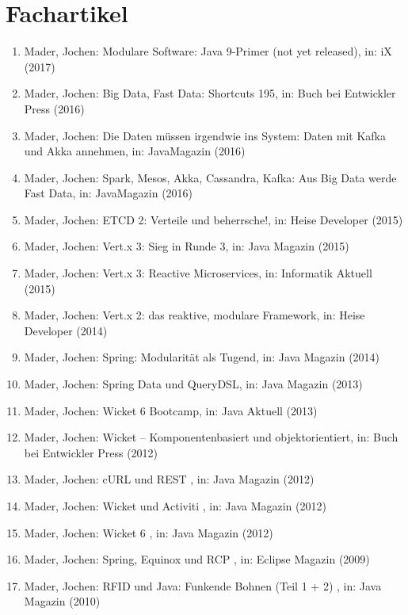 \section*{Fachartikel}
\begin{enumerate}[label=,leftmargin=0cm,itemsep=10pt]
\item Mader, Jochen: Modulare Software: Java 9-Primer (not yet released), in: iX (2017)
\item Mader, Jochen: Big Data, Fast Data: Shortcuts 195, in: Buch bei Entwickler Press (2016)
\item Mader, Jochen: Die Daten müssen irgendwie ins System: Daten mit Kafka und Akka annehmen, in: JavaMagazin (2016) 
\item Mader, Jochen: Spark, Mesos, Akka, Cassandra, Kafka: Aus Big Data werde Fast Data, in: JavaMagazin (2016)
\item Mader, Jochen: ETCD 2: Verteile und beherrsche!, in: Heise Developer (2015)
\item Mader, Jochen: Vert.x 3: Sieg in Runde 3, in: Java Magazin (2015)
\item Mader, Jochen: Vert.x 3: Reactive Microservices, in: Informatik Aktuell (2015)
\item Mader, Jochen: Vert.x 2: das reaktive, modulare Framework, in: Heise Developer (2014)
\item Mader, Jochen: Spring: Modularität als Tugend, in: Java Magazin (2014)
\item Mader, Jochen: Spring Data und QueryDSL, in: Java Magazin (2013)
\item Mader, Jochen: Wicket 6 Bootcamp, in: Java Aktuell (2013)
\item Mader, Jochen: Wicket – Komponentenbasiert und objektorientiert, in: Buch bei Entwickler Press (2012)
\item Mader, Jochen: cURL und REST , in: Java Magazin (2012)
\item Mader, Jochen: Wicket und Activiti , in: Java Magazin (2012)
\item Mader, Jochen: Wicket 6 , in: Java Magazin (2012)
\item Mader, Jochen: Spring, Equinox und RCP , in: Eclipse Magazin (2009)
\item Mader, Jochen: RFID und Java: Funkende Bohnen (Teil 1 + 2) , in: Java Magazin (2010)
\end{enumerate}

